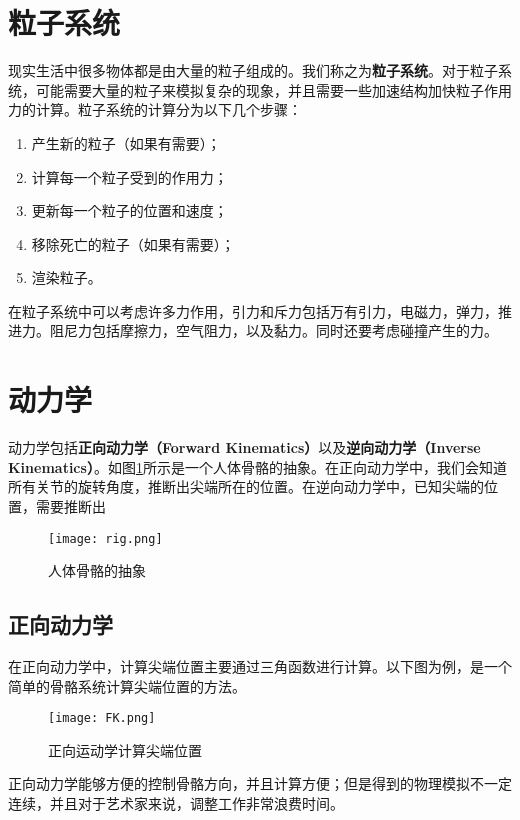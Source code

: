 \documentclass[openany]{progbookcn}
\begin{document}
\section{粒子系统}

现实生活中很多物体都是由大量的粒子组成的。我们称之为\textbf{粒子系统}。对于粒子系统，可能需要大量的粒子来模拟复杂的现象，并且需要一些加速结构加快粒子作用力的计算。粒子系统的计算分为以下几个步骤：
\begin{enumerate}
	\item 产生新的粒子（如果有需要）；
	\item 计算每一个粒子受到的作用力；
	\item 更新每一个粒子的位置和速度；
	\item 移除死亡的粒子（如果有需要）；
	\item 渲染粒子。
\end{enumerate}


在粒子系统中可以考虑许多力作用，引力和斥力包括万有引力，电磁力，弹力，推进力。阻尼力包括摩擦力，空气阻力，以及黏力。同时还要考虑碰撞产生的力。

\section{动力学}

动力学包括\textbf{正向动力学（Forward Kinematics）}以及\textbf{逆向动力学（Inverse Kinematics）}。如图\ref{fig:gg}所示是一个人体骨骼的抽象。在正向动力学中，我们会知道所有关节的旋转角度，推断出尖端所在的位置。在逆向动力学中，已知尖端的位置，需要推断出


\begin{figure}[H]
	\centering
	\texttt{[image: rig.png]}
	\caption{人体骨骼的抽象}
	\label{fig:gg}
\end{figure}

\subsection{正向动力学}

在正向动力学中，计算尖端位置主要通过三角函数进行计算。以下图为例，是一个简单的骨骼系统计算尖端位置的方法。

\begin{figure}[H]
	\centering
	\texttt{[image: FK.png]}
	\caption{正向运动学计算尖端位置}
	\label{fig:fk}
\end{figure}

正向动力学能够方便的控制骨骼方向，并且计算方便；但是得到的物理模拟不一定连续，并且对于艺术家来说，调整工作非常浪费时间。
\end{document}
